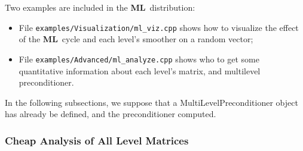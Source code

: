 \documentclass{article}[11pt]
\newcommand{\ML}     {{\bf ML}}
\begin{document}
Two examples are included in the \ML~distribution:
\begin{itemize}
\item File \verb!examples/Visualization/ml_viz.cpp! shows how to
visualize the effect of the \ML~cycle and each level's smoother on a random vector;
\item File \verb!examples/Advanced/ml_analyze.cpp! shows who to
get some quantitative information about each level's matrix, and multilevel preconditioner.
\end{itemize}

In the following subsections, we suppose that a MultiLevelPreconditioner 
object has already be defined,
and the preconditioner computed. 


\subsubsection{Cheap Analysis of All Level Matrices}
\end{document}
